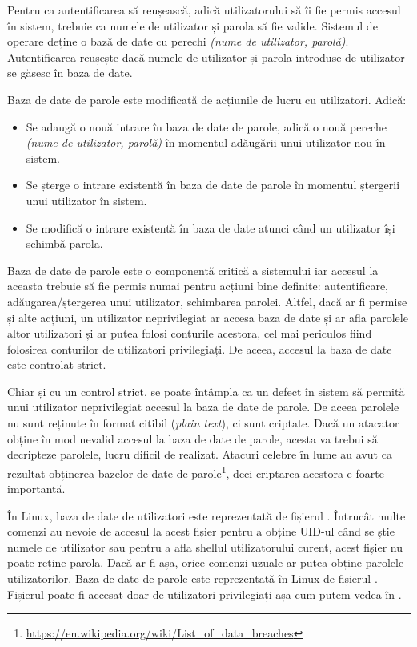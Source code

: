 Pentru ca autentificarea să reușească, adică utilizatorului să îi fie permis
accesul în sistem, trebuie ca numele de utilizator și parola să fie valide.
Sistemul de operare deține o bază de date cu perechi \textit{(nume de utilizator,
parolă)}. Autentificarea reușește dacă numele de utilizator și parola introduse
de utilizator se găsesc în baza de date.

Baza de date de parole este modificată de acțiunile de lucru cu utilizatori. Adică:

\begin{itemize}
	\item Se adaugă o nouă intrare în baza de date de parole, adică o nouă
          pereche \textit{(nume de utilizator, parolă)} în momentul adăugării unui
		utilizator nou în sistem.
	\item Se șterge o intrare existentă în baza de date de parole în
		momentul ștergerii unui utilizator în sistem.
	\item Se modifică o intrare existentă în baza de date atunci când un
		utilizator își schimbă parola.
\end{itemize}

Baza de date de parole este o componentă critică a sistemului iar accesul la
aceasta trebuie să fie permis numai pentru acțiuni bine definite: autentificare,
adăugarea/ștergerea unui utilizator, schimbarea parolei. Altfel, dacă ar fi
permise și alte acțiuni, un utilizator neprivilegiat ar accesa baza de date și
ar afla parolele altor utilizatori și ar putea folosi conturile acestora, cel
mai periculos fiind folosirea conturilor de utilizatori privilegiați. De aceea,
accesul la baza de date este controlat strict.

Chiar și cu un control strict, se poate întâmpla ca un defect în sistem să
permită unui utilizator neprivilegiat accesul la baza de date de parole. De
aceea parolele nu sunt reținute în format citibil (\textit{plain text}), ci sunt criptate.
Dacă un atacator obține în mod nevalid accesul la baza de date de parole, acesta
va trebui să decripteze parolele, lucru dificil de realizat. Atacuri celebre în
lume au avut ca rezultat obținerea bazelor de date de
parole\footnote{\url{https://en.wikipedia.org/wiki/List\_of\_data\_breaches}}, deci
criptarea acestora e foarte importantă.

În Linux, baza de date de utilizatori este reprezentată de fișierul .
Întrucât multe comenzi au nevoie de accesul la acest fișier pentru a obține
UID-ul când se știe numele de utilizator sau pentru a afla shellul
utilizatorului curent, acest fișier nu poate reține parola. Dacă ar fi așa,
orice comenzi uzuale ar putea obține parolele utilizatorilor. Baza de date de
parole este reprezentată în Linux de fișierul . Fișierul 
poate fi accesat doar de utilizatori privilegiați așa cum putem vedea în .

